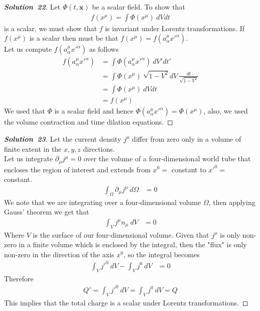 \documentclass[11pt]{article}
\theoremstyle{definition}
\renewcommand*{\proofname}{\bf{Solution}}
\begin{document}
\cleardoublepage
\begin{proof}[\proofname\ 22]
Let $\Phi(t,\bm{x})$ be a scalar field. To show that 
\begin{align*}
    f(x^\mu) = \int \Phi(x^\mu)~dVdt
\end{align*}
is a scalar, we must show that $f$ is invariant under Lorentz transformations.
If $f(x^\mu)$ is a scalar then must be that $f(x^\mu) = f(a_\alpha^\mu x'^\alpha)$. \\
Let us compute $f(a_\alpha^\mu x'^\alpha)$ as follows
\begin{align*}
    f(a_\alpha^\mu x'^\alpha)
    &= \int \Phi(a_\alpha^\mu x'^\alpha)~dV'dt' \\
    &= \int \Phi(x^\mu)~\sqrt{1 - V^2}dV~\frac{dt}{\sqrt{1 - V^2}} \\
    &= \int \Phi(x^\mu)~dVdt \\
    &= f(x^\mu)
\end{align*}
We used that $\Phi$ is a scalar field and hence
$\Phi(a_\alpha^\mu x'^\alpha) = \Phi(x^\mu)$, also, we used the volume
contraction and time dilation equations.
\end{proof}

\cleardoublepage
\begin{proof}[\proofname\ 23]
Let the current density $j^\mu$ differ from zero only in a volume of
finite extent in the $x, y, z$ directions.\\
Let us integrate $\partial_\mu j^\mu = 0$ over the volume of a four-dimensional
world tube that encloses the region of interest and extends from $x^0 =$
constant to $x'^0 =$ constant.
\begin{align*}
    \int_\Omega \partial_\mu j^\mu ~ d\Omega &= 0
\end{align*}
We note that we are integrating over a four-dimensional volume $\Omega$,
then applying Gauss' theorem we get that
\begin{align*}
    \int_V j^\mu n_\mu ~ dV &= 0
\end{align*}
Where $V$ is the surface of our four-dimensional volume. Given that $j^\mu$ is
only non-zero in a finite volume which is enclosed by the integral, then
the "flux" is only non-zero in the direction of the axis $x^0$, so the integral
becomes
\begin{align*}
    \int_V j'^0 ~ dV - \int_V j^0 ~ dV &= 0
\end{align*}
Therefore 
\begin{align*}
    Q' = \int_V j'^0 ~ dV = \int_V j^0 ~ dV = Q
\end{align*}
This implies that the total charge is a scalar under Lorentz transformations.
\end{proof}
\end{document}
